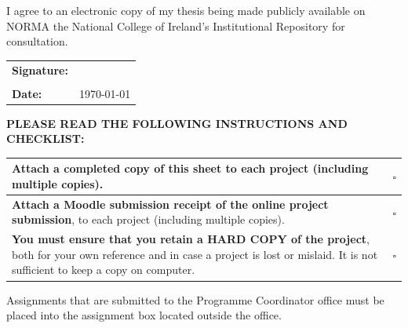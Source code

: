 I agree to an electronic copy of my thesis being made publicly available on NORMA the National College of Ireland’s Institutional Repository for consultation.

\begin{table}[!h]
\begin{center}
\small
\begin{tabular}{||p{}|p{}||}
	\hline
	\textbf{Signature:} &        \\
	                    &        \\ \hline
	\textbf{Date:}      & \today \\ \hline
\end{tabular}
\end{center}
\end{table}

\vspace{-.5cm}
\noindent \textbf{PLEASE READ THE FOLLOWING INSTRUCTIONS AND CHECKLIST:}\\
\vspace{-.5cm}

\begin{table}[!h]
\begin{center}
\small
\begin{tabular}{||p{}|p{}||}
	\hline
	Attach a completed copy of this sheet to each project (including multiple copies).                                                                                                           & $\square$ \\ \hline
	\textbf{Attach a Moodle submission receipt of the online project submission}, to each project (including multiple copies).                                                                   & $\square$ \\ \hline
	\textbf{You must ensure that you retain a HARD COPY of the project}, both for your own reference and in case a project is lost or mislaid. It is not sufficient to keep a copy on computer. & $\square$ \\ \hline
\end{tabular}
\end{center}
\end{table}
\vspace{-.5cm}

Assignments that are submitted to the Programme Coordinator office must be placed into the assignment box located outside the office.

